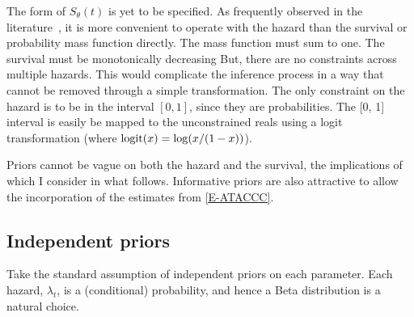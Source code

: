 \documentclass[thesis.tex]{subfiles}
\begin{document}
The form of $S_\theta(t)$ is yet to be specified.
As frequently observed in the literature~\autocite[e.g.:][]{heBayesian}, it is more convenient to operate with the hazard than the survival or probability mass function directly.
The mass function must sum to one.
The survival must be monotonically decreasing
But, there are no constraints across multiple hazards.
This would complicate the inference process in a way that cannot be removed through a simple transformation.
The only constraint on the hazard is to be in the interval $[0, 1]$, since they are probabilities.
The [0, 1] interval is easily be mapped to the unconstrained reals using a logit transformation (where $\operatorname{logit}(x) = \log(x/(1-x))$).

Priors cannot be vague on both the hazard and the survival, the implications of which I consider in what follows.
Informative priors are also attractive to allow the incorporation of the estimates from \cref{E-ATACCC}.

\subsection{Independent priors} \label{perf-test:sec:independent-priors}
Take the standard assumption of independent priors on each parameter.
Each hazard, $\lambda_t$, is a (conditional) probability, and hence a Beta distribution is a natural choice.
\end{document}
